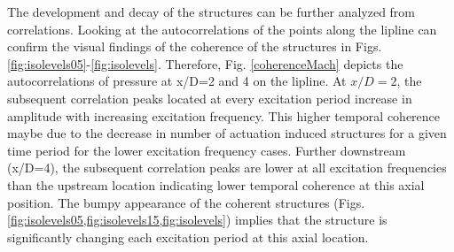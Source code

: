 \documentclass[english]{aiaa-tc}
\begin{document}
The development and decay of the structures can be further analyzed from correlations. Looking at the autocorrelations of the points along the lipline can confirm the visual findings of the coherence of the structures in Figs. \ref{fig:isolevels05}-\ref{fig:isolevels}.
Therefore, Fig. \ref{coherenceMach} depicts the autocorrelations of pressure at x/D=2 and 4 on the lipline.
At $x/D=2$, the subsequent correlation peaks located at every excitation period increase in amplitude with increasing excitation frequency. This higher temporal coherence maybe due to the decrease in number of actuation induced structures for a given time period for the lower excitation frequency cases.
Further downstream (x/D=4), the subsequent correlation peaks are lower at all excitation frequencies than the upstream location indicating lower temporal coherence at this axial position.
The bumpy appearance of the coherent structures (Figs. \ref{fig:isolevels05,fig:isolevels15,fig:isolevels}) implies that the structure is significantly changing each excitation period at this axial location.
\end{document}
